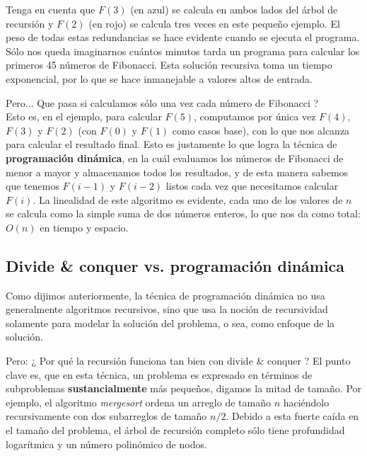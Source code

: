 Tenga en cuenta que $F(3)$ (en azul) se calcula en ambos lados del árbol de recursión y $F(2)$ (en rojo) se calcula tres veces en este
pequeño ejemplo. El peso de todas estas redundancias se hace evidente cuando se ejecuta el programa. Sólo nos queda imaginarnos cuántos
minutos tarda un programa para calcular los primeros 45 números de Fibonacci. Esta solución recursiva toma un tiempo exponencial, por lo que
se hace inmanejable a valores altos de entrada.

Pero... Que pasa si calculamos sólo una vez cada número de Fibonacci ?\\Esto es, en el ejemplo, para calcular $F(5)$, computamos por única
vez $F(4)$, $F(3)$ y $F(2)$ (con  $F(0)$ y $F(1)$ como casos base), con lo que nos alcanza para calcular el resultado final. Esto es
justamente lo que logra la técnica de \textbf{programación dinámica}, en la cuál evaluamos los números de Fibonacci de menor a mayor y
almacenamos todos los resultados, y de esta manera sabemos que tenemos $F(i-1)$ y $F(i-2)$ listos cada vez que necesitamos calcular $F(i)$.
La linealidad de este algoritmo es evidente, cada uno de los valores de $n$ se calcula como la simple suma de dos números enteros, lo que
nos da como total: $O(n)$ en tiempo y espacio.



\subsection{Divide \& conquer vs. programación dinámica}

Como dijimos anteriormente, la técnica de programación dinámica no usa generalmente algoritmos recursivos, sino que usa la noción de
recursividad solamente para modelar la solución del problema, o sea, como enfoque de la solución.

Pero: ¿ Por qué la recursión funciona tan bien con divide \& conquer ? El punto clave es, que en esta técnica, un problema es expresado en
términos de subproblemas \textbf{sustancialmente} más pequeños, digamos la mitad de tamaño. Por ejemplo, el algoritmo \textit{mergesort}
ordena un arreglo de tamaño $n$ haciéndolo recursivamente con dos subarreglos de tamaño $n/2$. Debido a esta fuerte caída en el tamaño del
problema, el árbol de recursión completo sólo tiene profundidad logarítmica y un número polinómico de nodos.

